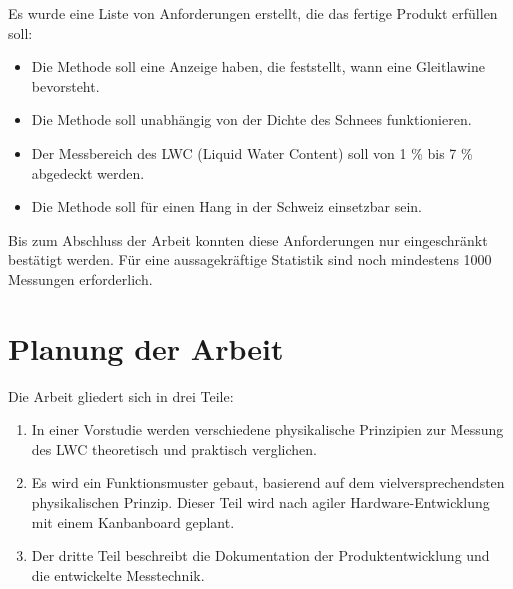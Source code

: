 Es wurde eine Liste von Anforderungen erstellt, die das fertige Produkt erfüllen soll:
\begin{itemize}
    \item Die Methode soll eine Anzeige haben, die feststellt, wann eine Gleitlawine bevorsteht.
    \item Die Methode soll unabhängig von der Dichte des Schnees funktionieren.
    \item Der Messbereich des LWC (Liquid Water Content) soll von 1 \% bis 7 \% abgedeckt werden.
    \item Die Methode soll für einen Hang in der Schweiz einsetzbar sein.
\end{itemize}

Bis zum Abschluss der Arbeit konnten diese Anforderungen nur eingeschränkt bestätigt werden. Für eine aussagekräftige Statistik sind noch mindestens 1000 Messungen erforderlich.

\section{Planung der Arbeit}

Die Arbeit gliedert sich in drei Teile:
\begin{enumerate}
    \item In einer Vorstudie werden verschiedene physikalische Prinzipien zur Messung des LWC theoretisch und praktisch verglichen.
    \item Es wird ein Funktionsmuster gebaut, basierend auf dem vielversprechendsten physikalischen Prinzip. Dieser Teil wird nach agiler Hardware-Entwicklung mit einem Kanbanboard geplant.
    \item Der dritte Teil beschreibt die Dokumentation der Produktentwicklung und die entwickelte Messtechnik.
\end{enumerate}
\fi
